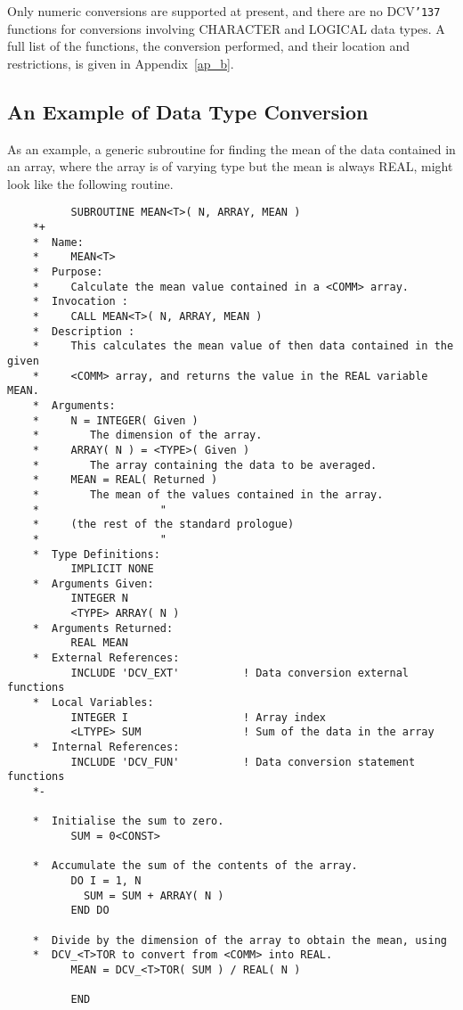 \documentclass[twoside,11pt]{article}
\renewcommand{\_}{{\tt\char'137}}     %
\newcommand{\htmlref}[2]{#1}
\newcommand{\latexelsehtml}[2]{#1}
\newcommand{\latexelsehtml}[2]{#2}
\begin{document}
Only numeric conversions are supported at present, and
there are no DCV\_ functions for conversions involving CHARACTER and
LOGICAL data types.
A full list of the functions, the conversion performed, and their
location and restrictions, is given in
\latexelsehtml{Appendix~\ref{ap_b}}{the
\htmlref{conversion functions}{ap_b}}.

\subsection{An Example of Data Type Conversion}

As an example, a generic subroutine for finding the mean of the data
contained in an array, where the array is of varying type but the mean is
always REAL, might look like the following routine.

\begin{verbatim}
          SUBROUTINE MEAN<T>( N, ARRAY, MEAN )
    *+
    *  Name:
    *     MEAN<T>
    *  Purpose:
    *     Calculate the mean value contained in a <COMM> array.
    *  Invocation :
    *     CALL MEAN<T>( N, ARRAY, MEAN )
    *  Description :
    *     This calculates the mean value of then data contained in the given
    *     <COMM> array, and returns the value in the REAL variable MEAN.
    *  Arguments:
    *     N = INTEGER( Given )
    *        The dimension of the array.
    *     ARRAY( N ) = <TYPE>( Given )
    *        The array containing the data to be averaged.
    *     MEAN = REAL( Returned )
    *        The mean of the values contained in the array.
    *                   "
    *     (the rest of the standard prologue)
    *                   "
    *  Type Definitions:
          IMPLICIT NONE
    *  Arguments Given:
          INTEGER N
          <TYPE> ARRAY( N )
    *  Arguments Returned:
          REAL MEAN
    *  External References:
          INCLUDE 'DCV_EXT'          ! Data conversion external functions
    *  Local Variables:
          INTEGER I                  ! Array index
          <LTYPE> SUM                ! Sum of the data in the array
    *  Internal References:
          INCLUDE 'DCV_FUN'          ! Data conversion statement functions
    *-

    *  Initialise the sum to zero.
          SUM = 0<CONST>

    *  Accumulate the sum of the contents of the array.
          DO I = 1, N
            SUM = SUM + ARRAY( N )
          END DO

    *  Divide by the dimension of the array to obtain the mean, using
    *  DCV_<T>TOR to convert from <COMM> into REAL.
          MEAN = DCV_<T>TOR( SUM ) / REAL( N )

          END
\end{verbatim}
\end{document}
